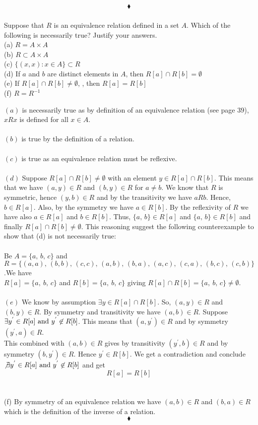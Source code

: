 $$\blacklozenge$$
\subsubsection{}
\begin{tcolorbox}
Suppose that $R$  is an equivalence relation defined in a set $A$. Which of the following is necessarily true? Justify your answers.\\
(a) $R=A\times A$\\
(b) $R\subset  A \times A$ \\
(c) $\{(x, x):x \in  A\}\subset R$\\
(d) If $a$ and $b$ are distinct elements in $A$, then $R[a]\cap R[b] =\emptyset $\\
(e) If $R[a] \cap  R[b] \neq \emptyset$, , then $R[a]=R[b]$\\
(f) $R= R^{-1}$
\end{tcolorbox}
$$ $$
$(a)$ is necessarily true as by definition of an equivalence relation (see page $39$), $xRx$ is defined for all $x\in A$.\\\\
$(b)$ is true by the definition of a relation.\\\\
$(c)$ is true as an equivalence relation must be reflexive.\\\\
$(d)$ Suppose $R[a]\cap R[b]\neq \emptyset$ with an element $y\in R[a]\cap R[b]$. This means that we have $(a,y)\in R$ and $(b,y)\in R$ for $a\neq b$. We know that $R$ is symmetric, hence $(y,b)\in R$ and by the transitivity we have $aRb$. Hence, $b\in R[a]$. Also, by the symmetry we have $a\in R[b]$. By the reflexivity of $R$ we have also $a\in R[a]$ and $b\in R[b]$. Thus, $\{a,\, b\}\in R[a]$ and $\{a,\, b\}\in R[b]$ and finally $R[a]\cap R[b]\neq \emptyset$. This reasoning suggest the following counterexample to show that (d) is not necessarily true:\\\\
Be $A= \{a,\,b,\, c\}$ and $R = \{(a,a),\, (b,b) ,\, (c,c),\,(a,b),\, (b,a) ,\, (a,c),\,(c,a),\, (b,c) ,\, (c,b)\}$.We have \\
$R[a]=\{a,\ b,\, c\}$ and $R[b]=\{a,\ b,\, c\}$ giving $R[a]\cap R[b]=\{a,\ b,\, c\}\neq \emptyset$.\\\\
$(e)$ 
We know by assumption $\exists y\in R[a]\cap R[b]$. So, $(a,y)\in R$ and $(b,y)\in R$. By symmetry and transitivity we have $(a,b)\in R$. Suppose $\exists y^{'}\in R[a]\text{ and } y^{'}\not\in R[b]$. This means that $(a,y^{'})\in R$ and by symmetry $(y^{'},a)\in R$. \\
This combined with   $(a,b)\in R$ gives by transitivity $(y^{'},b)\in R$ and by symmetry $(b, y^{'})\in R$. Hence $y^{'}\in R[b]$. We get a contradiction and conclude $\not \exists y^{'}\in R[a]\text{ and } y^{'}\not\in R[b]$ and get 
$$R[a]=R[b]$$\\\\
(f) By symmetry of an equivalence relation we have $(a,b) \in R$ and $(b,a)\in R$ which is the definition of the inverse of a relation. 
$$\blacklozenge$$

